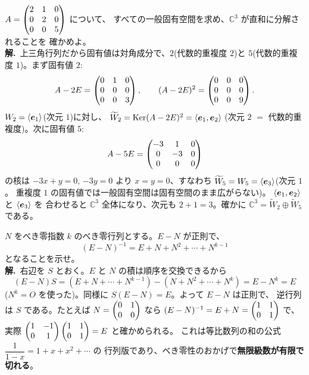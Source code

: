 \begin{rei}[例題・標準(一般固有空間分解)]\label{rei:nilp-decomp3}
$A = \begin{pmatrix}2 & 1 & 0 \\ 0 & 2 & 0 \\ 0 & 0 & 5\end{pmatrix}$ について、
すべての一般固有空間を求め、$\mathbb{C}^3$ が直和に分解されることを
確かめよ。\\
\textbf{解.}\ 上三角行列だから固有値は対角成分で、$2$(代数的重複度 $2$)と
$5$(代数的重複度 $1$)。まず固有値 $2$:
\[
A - 2E = \begin{pmatrix}0 & 1 & 0 \\ 0 & 0 & 0 \\ 0 & 0 & 3\end{pmatrix}, \qquad
(A - 2E)^2 = \begin{pmatrix}0 & 0 & 0 \\ 0 & 0 & 0 \\ 0 & 0 & 9\end{pmatrix}.
\]
$W_2 = \langle \bm{e}_1 \rangle$(次元 $1$)に対し、
$\widetilde{W}_2 = \mathrm{Ker}(A - 2E)^2 = \langle \bm{e}_1, \bm{e}_2 \rangle$
(次元 $2$ $=$ 代数的重複度)。次に固有値 $5$:
\[
A - 5E = \begin{pmatrix}-3 & 1 & 0 \\ 0 & -3 & 0 \\ 0 & 0 & 0\end{pmatrix}
\]
の核は $-3x + y = 0$, $-3y = 0$ より $x = y = 0$、すなわち
$\widetilde{W}_5 = W_5 = \langle \bm{e}_3 \rangle$(次元 $1$。
重複度 $1$ の固有値では一般固有空間は固有空間のまま広がらない)。
$\langle \bm{e}_1, \bm{e}_2 \rangle$ と $\langle \bm{e}_3 \rangle$ を
合わせると $\mathbb{C}^3$ 全体になり、次元も $2 + 1 = 3$。確かに
$\mathbb{C}^3 = \widetilde{W}_2 \oplus \widetilde{W}_5$ である。
\end{rei}

\begin{rei}[例題・標準(証明:$E - N$ の正則性)]\label{rei:nilp-neumann}
$N$ をべき零指数 $k$ のべき零行列とする。$E - N$ が正則で、
\[
(E - N)^{-1} = E + N + N^2 + \cdots + N^{k-1}
\]
となることを示せ。\\
\textbf{解.}\ 右辺を $S$ とおく。$E$ と $N$ の積は順序を交換できるから
\[
(E - N)S = (E + N + \cdots + N^{k-1}) - (N + N^2 + \cdots + N^k)
= E - N^k = E
\]
($N^k = O$ を使った)。同様に $S(E - N) = E$。よって $E - N$ は正則で、
逆行列は $S$ である。たとえば $N = \begin{pmatrix}0 & 1 \\ 0 & 0\end{pmatrix}$ なら
$(E - N)^{-1} = E + N = \begin{pmatrix}1 & 1 \\ 0 & 1\end{pmatrix}$ で、実際
$\begin{pmatrix}1 & -1 \\ 0 & 1\end{pmatrix}\begin{pmatrix}1 & 1 \\ 0 & 1\end{pmatrix} = E$ と確かめられる。
これは等比数列の和の公式 $\dfrac{1}{1 - x} = 1 + x + x^2 + \cdots$ の
行列版であり、べき零性のおかげで\textbf{無限級数が有限で切れる}。
\end{rei}

